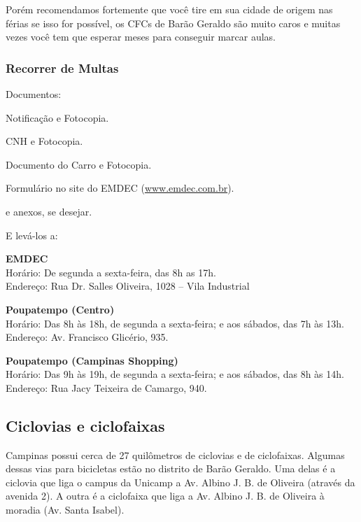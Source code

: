 Porém recomendamos fortemente que você tire em sua cidade de origem nas férias
se isso for possível, os CFCs de Barão Geraldo são muito caros e muitas vezes
você tem que esperar meses para conseguir marcar aulas.

\subsubsection{Recorrer de Multas}

Documentos:
\begin{compactitemize}
\item Notificação e Fotocopia.
\item CNH e Fotocopia.
\item Documento do Carro e Fotocopia.
\item Formulário no site do EMDEC (\url{www.emdec.com.br}).
\item e anexos, se desejar.
\end{compactitemize}

E levá-los a:
\begin{compactitemize}
\item \textbf{EMDEC}
  \\Horário: De segunda a sexta-feira, das 8h as 17h.
  \\Endereço: Rua Dr. Salles Oliveira, 1028 -- Vila Industrial

\item \textbf{Poupatempo (Centro)}
  \\Horário: Das 8h às 18h, de segunda a sexta-feira; e aos sábados, das 7h às
  13h.
  \\Endereço: Av. Francisco Glicério, 935.

\item \textbf{Poupatempo (Campinas Shopping)}
  \\Horário: Das 9h às 19h, de segunda a sexta-feira; e aos sábados, das 8h às
  14h.
  \\Endereço: Rua Jacy Teixeira de Camargo, 940.
\end{compactitemize}

\subsection{Ciclovias e ciclofaixas}

Campinas possui cerca de 27 quilômetros de ciclovias e de ciclofaixas. Algumas
dessas vias para bicicletas estão no distrito de Barão Geraldo. Uma delas é a
ciclovia que liga o campus da Unicamp a Av. Albino J. B. de Oliveira (através
da avenida 2). A outra é a ciclofaixa que liga a Av. Albino J. B. de Oliveira
à moradia (Av. Santa Isabel).

